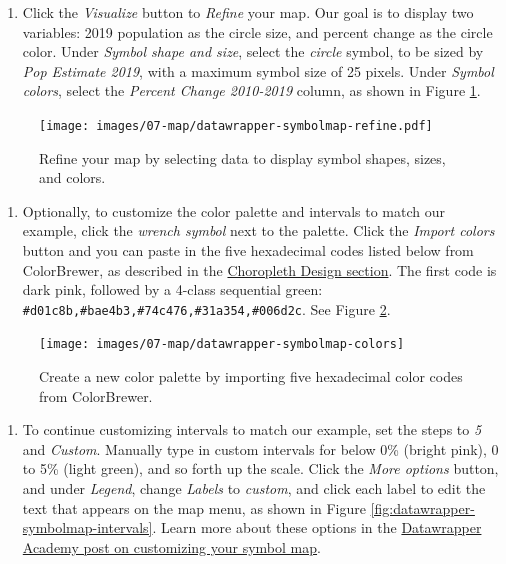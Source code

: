 \documentclass[
  english,
]{book}
\providecommand{\tightlist}{%
  \setlength{\itemsep}{0pt}\setlength{\parskip}{0pt}}
\begin{document}
\begin{enumerate}
\def\labelenumi{\arabic{enumi}.}
\setcounter{enumi}{6}
\tightlist
\item
  Click the \emph{Visualize} button to \emph{Refine} your map. Our goal is to display two variables: 2019 population as the circle size, and percent change as the circle color. Under \emph{Symbol shape and size}, select the \emph{circle} symbol, to be sized by \emph{Pop Estimate 2019}, with a maximum symbol size of 25 pixels. Under \emph{Symbol colors}, select the \emph{Percent Change 2010-2019} column, as shown in Figure \ref{fig:datawrapper-symbolmap-refine}.
\end{enumerate}



\begin{figure}
\centering
\texttt{[image: images/07-map/datawrapper-symbolmap-refine.pdf]}
\caption{\label{fig:datawrapper-symbolmap-refine}Refine your map by selecting data to display symbol shapes, sizes, and colors.}
\end{figure}

\begin{enumerate}
\def\labelenumi{\arabic{enumi}.}
\setcounter{enumi}{7}
\tightlist
\item
  Optionally, to customize the color palette and intervals to match our example, click the \emph{wrench symbol} next to the palette. Click the \emph{Import colors} button and you can paste in the five hexadecimal codes listed below from ColorBrewer, as described in the \href{design-choropleth.html}{Choropleth Design section}. The first code is dark pink, followed by a 4-class sequential green: \texttt{\#d01c8b,\#bae4b3,\#74c476,\#31a354,\#006d2c}. See Figure \ref{fig:datawrapper-symbolmap-colors}.
\end{enumerate}



\begin{figure}
\texttt{[image: images/07-map/datawrapper-symbolmap-colors]} \caption{Create a new color palette by importing five hexadecimal color codes from ColorBrewer.}\label{fig:datawrapper-symbolmap-colors}
\end{figure}

\begin{enumerate}
\def\labelenumi{\arabic{enumi}.}
\setcounter{enumi}{8}
\tightlist
\item
  To continue customizing intervals to match our example, set the steps to \emph{5} and \emph{Custom}. Manually type in custom intervals for below 0\% (bright pink), 0 to 5\% (light green), and so forth up the scale. Click the \emph{More options} button, and under \emph{Legend}, change \emph{Labels} to \emph{custom}, and click each label to edit the text that appears on the map menu, as shown in Figure \ref{fig:datawrapper-symbolmap-intervals}. Learn more about these options in the \href{https://academy.datawrapper.de/article/120-customizing-your-symbol-map}{Datawrapper Academy post on customizing your symbol map}.
\end{enumerate}
\end{document}
